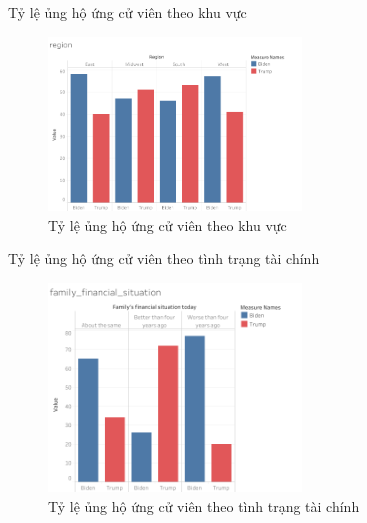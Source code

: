 \documentclass[10pt]{beamer}
\theoremstyle{remark}
\theoremstyle{definition}
\begin{document}
\begin{frame}{Tỷ lệ ủng hộ ứng cử viên theo khu vực}
	\begin{figure}[h!]
        \centering
        \includegraphics[width=0.6\textwidth]{figures/region.png}
        \caption{Tỷ lệ ủng hộ ứng cử viên theo khu vực}
    \end{figure}
\end{frame}

\begin{frame}{Tỷ lệ ủng hộ ứng cử viên theo tình trạng tài chính}
	\begin{figure}[h!]
        \centering
        \includegraphics[width=0.6\textwidth]{figures/family_financial_situation.png}
        \caption{Tỷ lệ ủng hộ ứng cử viên theo tình trạng tài chính}
    \end{figure}
\end{frame}
\end{document}
